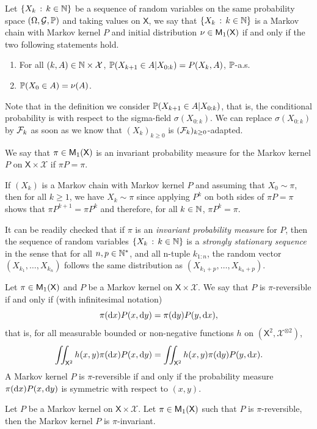 \documentclass[english,graybox,envcountchap,envcountsame,sectrefs,shortlabels]{svmono}
\theoremstyle{style}
\newcommand{\Xset}{\mathsf{X}}
\newcommand{\Xsigma}{\mathcal{X}}
\begin{document}
\begin{definition}
Let $\left\{ X_{k}\,:\,k\in\mathbb{N}\right\}$
be a sequence of random variables on the same probability space $(\Omega,\mathcal{G},\mathbb{P})$
and taking values on $\Xset$, we say that $\left\{ X_{k}\,:\,k\in\mathbb{N}\right\}$
is a Markov chain with Markov kernel $P$ and initial distribution
$\nu\in\meas 1(\Xset)$ if and only if the two following statements hold.
\begin{enumerate}
\item  For all $(k,A)\in\nset\times\Xsigma$,  $\mathbb{P}(X_{k+1}\in A|X_{0:k})=P(X_{k},A)$,
$\mathbb{P}$-a.s.
\item $\mathbb{P}(X_{0}\in A)=\nu(A)$.
\end{enumerate}
\end{definition}
Note that in the definition we consider $\mathbb{P}(X_{k+1}\in A|X_{0:k})$,
that is, the conditional probability is with respect to the sigma-field
$\sigma(X_{0:k})$. We can replace $\sigma(X_{0:k})$ by
$\mathcal{F}_{k}$ as soon as we know that $(X_{k})_{k\geq0}$ is $(\mathcal{F}_{k})_{k\geq0}$-adapted.

\begin{definition}
We say that $\pi\in\meas 1(\Xset)$ is an invariant probability measure
for the Markov kernel $P$ on $\Xset\times\Xsigma$ if $\pi P=\pi$.
\end{definition}
If $(X_{k})$ is a Markov chain with Markov kernel $P$
and assuming that $X_{0}\sim\pi$, then for all $k\geq1$, we have
$X_{k}\sim\pi$ since applying $P^{k}$ on
both sides of $\pi P=\pi$ shows that $\pi P^{k+1}=\pi P^{k}$ and
therefore, for all $k\in\mathbb{N}$, $\pi P^{k}=\pi$. 

It can be readily checked that if $\pi$ is an \emph{invariant
probability measure }for $P$, then the sequence of random variables
$\left\{ X_{k}\,:\,k\in\mathbb{N}\right\}$ is a \emph{strongly stationary sequence} in the sense that for all $n,p\in\mathbb{N}^{*}$,
and all n-tuple $k_{1:n}$, the random vector $(X_{k_{1}},\ldots,X_{k_{n}})$
follows the same distribution as $(X_{k_{1}+p},\ldots,X_{k_{n}+p})$.

\begin{definition}
Let $\pi\in\meas 1(\Xset)$ and $P$ be a Markov kernel on $\Xset\times\Xsigma$.
We say that $P$ is $\pi$-reversible if and only if (with infinitesimal
notation)
\begin{equation}
\pi(\mathrm{d} x)P(x,\mathrm{d} y)=\pi(\mathrm{d} y)P(y,\mathrm{d} x),\label{eq:reversibility}
\end{equation}
that is, for all measurable bounded or non-negative functions $h$
on $\left(\Xset^{2},\Xsigma^{\otimes2}\right)$,
\begin{equation}
\iint_{\Xset^{2}}h(x,y)\pi(\rmd x)P(x,\rmd y)=\iint_{\Xset^{2}}h(x,y)\pi(\rmd y)P(y,\rmd x).\label{eq:reversibility:h}
\end{equation}
A Markov kernel $P$ is $\pi$-reversible if and only
if the probability measure $\pi(\mathrm{d} x)P(x,\mathrm{d} y)$ is symmetric
with respect to $(x,y)$. 
\end{definition}
\begin{proposition}
Let $P$ be a Markov kernel on $\Xset\times\Xsigma$. Let $\pi\in\meas 1(\Xset)$
such that $P$ is $\pi$-reversible, then the Markov kernel $P$ is
$\pi$-invariant.
\end{proposition}
\end{document}
